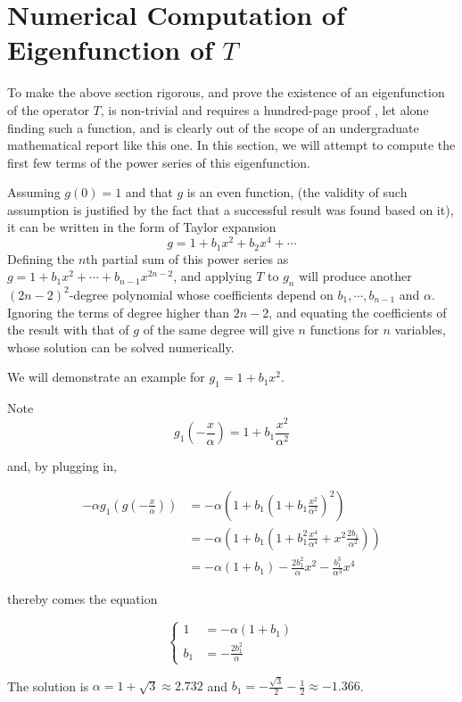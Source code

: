\section{Numerical Computation of Eigenfunction of $T$}

To make the above section rigorous, and prove the existence of an eigenfunction of the operator $T$, is non-trivial and requires a hundred-page proof \cite{lyubich1999feigenbaum}, let alone finding such a function, and is clearly out of the scope of an undergraduate mathematical report like this one. 
In this section, we will attempt to compute the first few terms of the power series of this eigenfunction.

Assuming $g(0) = 1$ and that $g$ is an even function, (the validity of such assumption is justified by the fact that a successful result was found based on it), it can be written in the form of Taylor expansion 
$$
g = 1 + b_1 x^2 + b_2x^4 + \cdots 
$$
Defining the $n$th partial sum of this power series as $g = 1 + b_1x^2 + \cdots + b_{n-1}x^{2n-2}$, and applying $T$ to $g_n$ will produce another $(2n-2)^2$-degree polynomial whose coefficients depend on $b_1, \cdots, b_{n-1}$ and $\alpha$.
Ignoring the terms of degree higher than $2n-2$, and equating the coefficients of the result with that of $g$ of the same degree will give $n$ functions for $n$ variables, whose solution can be solved numerically. 

We will demonstrate an example for $g_1 = 1 + b_1 x^2$. 

Note 
$$
g_1(-\frac{x}{\alpha}) = 1 + b_1 \frac{x^2}{\alpha ^2}
$$

and, by plugging in,

\begin{align*}
-\alpha g_1(g(-\frac{x}{\alpha})) 
&= -\alpha( 1 + b_1(1+b_1 \frac{x^2}{\alpha^2})^2) \\
&= -\alpha(1 + b_1(1 + b_1^2\frac{x^4}{\alpha^4} + x^2 \frac{2b_1}{\alpha^2})) \\
&= -\alpha (1 + b_1)  - \frac{2b_1^2}{\alpha} x^2 - \frac{b_1^3}{\alpha^3}x^4
\end{align*}

thereby comes the equation 

$$
\begin{cases}
    1 &= -\alpha(1+b_1) \\
    b_1 &= -\frac{2b_1^2}{\alpha} 
\end{cases}
$$

The solution is $\alpha = 1 + \sqrt{3} \approx 2.732$ and $b_1 = - \frac{\sqrt{3}}{2} - \frac{1}{2} \approx -1.366$.

